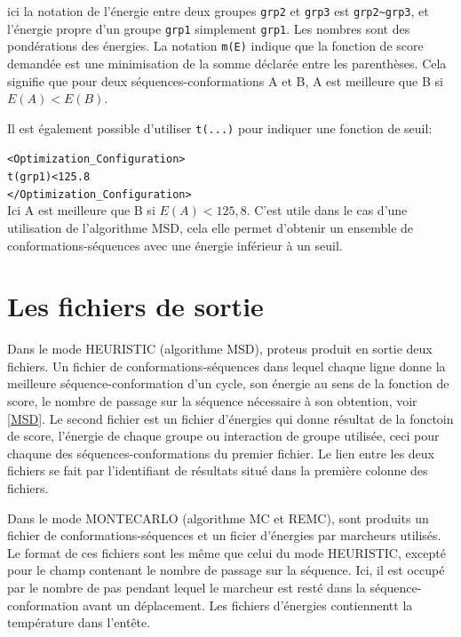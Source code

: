 \begin{enumerate}
ici la notation de l'énergie entre deux groupes \verb!grp2! et \verb!grp3! est \verb!grp2~grp3!, et  l'énergie propre d'un groupe \verb!grp1! simplement \verb!grp1!. Les nombres sont des pondérations des énergies. La notation \verb!m(E)! indique que la fonction de score demandée est une minimisation de la somme déclarée entre les parenthèses. Cela signifie que pour deux séquences-conformations A et B, A est meilleure que B si $E(A) < E(B)$.


Il est également possible d'utiliser \verb!t(...)! pour indiquer une fonction de seuil:

\verb!<Optimization_Configuration>! \\
\verb!t(grp1)<125.8! \\
\verb!</Optimization_Configuration>! \\

Ici A est meilleure que B si $E(A)<125,8$. C'est utile dans le cas d'une utilisation de l'algorithme MSD, cela elle permet d'obtenir un ensemble de conformations-séquences avec une énergie inférieur à un seuil.


\section{Les fichiers de sortie}

Dans le mode HEURISTIC (algorithme MSD), proteus produit en sortie deux fichiers. Un fichier de conformations-séquences dans lequel chaque ligne donne la meilleure séquence-conformation d'un cycle, son énergie au sens de la fonction de score, le nombre de passage sur la séquence nécessaire à son obtention, voir \ref{MSD}. Le second fichier est un fichier d'énergies qui donne résultat de la fonctoin de score, l'énergie de chaque groupe ou interaction de groupe utilisée, ceci pour chaqune des séquences-conformations du premier fichier. Le lien entre les deux fichiers se fait par l'identifiant de résultats situé dans la première colonne des fichiers.

Dans le mode MONTECARLO (algorithme MC et REMC), sont produits un fichier de conformations-séquences et un ficier d'énergies par marcheurs utilisés. Le format de ces fichiers sont les même que celui du mode HEURISTIC, excepté pour le champ contenant le nombre de passage sur la séquence. Ici, il est occupé par le nombre de pas pendant lequel le marcheur est resté dans la séquence-conformation avant un déplacement. Les fichiers d'énergies contiennentt la température dans l'entête.


\end{enumerate}
